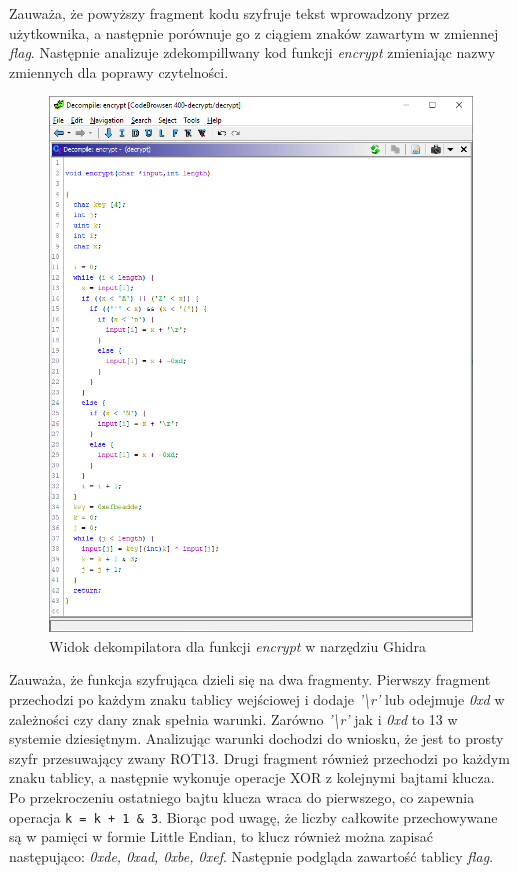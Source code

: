 \documentclass[language=polish,type=eng]{aghmodern}
\begin{document}
Zauważa, że powyższy fragment kodu szyfruje tekst wprowadzony przez użytkownika,
a następnie porównuje go z ciągiem znaków zawartym w zmiennej \emph{flag}.
Następnie analizuje zdekompillwany kod funkcji \emph{encrypt} zmieniając nazwy zmiennych
dla poprawy czytelności.

\begin{figure}[H]
\centering
\includegraphics[width=\textwidth]{400_encrypt}
\caption{Widok dekompilatora dla funkcji \emph{encrypt} w narzędziu Ghidra}
\end{figure}

Zauważa, że funkcja szyfrująca dzieli się na dwa fragmenty.
Pierwszy fragment przechodzi po każdym znaku tablicy wejściowej i dodaje
\emph{'\textbackslash r'} lub
odejmuje \emph{0xd} w zależności czy dany znak spełnia warunki.
Zarówno \emph{'\textbackslash r'} jak i \emph{0xd} to 13 w systemie dziesiętnym.
Analizując warunki dochodzi do wniosku, że jest to prosty szyfr przesuwający zwany ROT13.
Drugi fragment również przechodzi po każdym znaku tablicy, a następnie wykonuje
operacje XOR z kolejnymi bajtami klucza. Po przekroczeniu ostatniego bajtu klucza
wraca do pierwszego, co zapewnia operacja \texttt{k = k + 1 & 3}.
Biorąc pod uwagę, że liczby całkowite przechowywane
są w pamięci w formie Little Endian, to klucz również można zapisać następująco:
\emph{0xde, 0xad, 0xbe, 0xef}. Następnie podgląda zawartość tablicy \emph{flag}.
\end{document}

